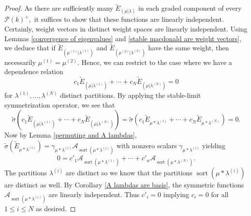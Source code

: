 \documentclass[11pt]{article}
\theoremstyle{definition}
\numberwithin{equation}{section}
\DeclareMathOperator{\sort}{sort}
\begin{document}
\begin{proof}
As there are sufficiently many $\widetilde{E}_{(\mu|\lambda)}$ in each graded component of every $\mathscr{P}(k)^{+},$ it suffices to show that these functions are linearly independent. Certainly, weight vectors in distinct weight spaces are linearly independent. Using Lemmas \ref{convergence of eigenvalues} and \ref{stable macdonald are weight vectors}, we deduce that if $\widetilde{E}_{(\mu^{(1)}|\lambda^{(1)})}$ and $\widetilde{E}_{(\mu^{(2)}|\lambda^{(2)})}$ have the same weight, then necessarily $\mu^{(1)} = \mu^{(2)}$. Hence, we can restrict to the case where we
have a dependence relation
$$ c_1\widetilde{E}_{(\mu|\lambda^{(1)})} +\cdots + c_N \widetilde{E}_{(\mu|\lambda^{(N)})} = 0 $$
for $\lambda^{(1)},\ldots,\lambda^{(N)}$ distinct partitions.
By applying the stable-limit symmetrization operator, we see that 
$$ \widetilde{\sigma}(c_1\widetilde{E}_{(\mu|\lambda^{(1)})} +\cdots + c_N \widetilde{E}_{(\mu|\lambda^{(N)})} ) = \widetilde{\sigma}(c_1\widetilde{E}_{\mu*\lambda^{(1)}} +\cdots+c_N \widetilde{E}_{\mu*\lambda^{(N)}}) = 0 .$$
Now by Lemma \ref{permuting and A lambdas}, $\widetilde{\sigma}(\widetilde{E}_{\mu*\lambda^{(i)}}) = \gamma_{\mu*\lambda^{(i)}}  \mathcal{A}_{\sort(\mu*\lambda^{(i)})} $ with nonzero scalars  $\gamma_{\mu*\lambda^{(i)}}$ yielding 
$$ 0 = c'_1\mathcal{A}_{\sort(\mu*\lambda^{(1)})} +\cdots+ c'_n \mathcal{A}_{\sort(\mu*\lambda^{(N)})}.$$ The partitions $\lambda^{(i)}$ are distinct so we know that the partitions $\sort(\mu*\lambda^{(i)})$ are distinct as well. By Corollary \ref{A lambdas are basis}, the symmetric functions $\mathcal{A}_{\sort(\mu*\lambda^{(i)})}$ are linearly independent. Thus $c'_i = 0$ implying $c_i = 0$ for all $1 
\leq i \leq N$ as desired.
\end{proof}
\end{document}

